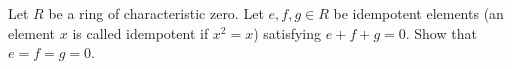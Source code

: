 Let $R$ be a ring of characteristic zero. Let $e,f,g\in R$ be idempotent elements (an element $x$ is called idempotent if $x^2=x$) satisfying $e+f+g=0$. Show that $e=f=g=0$.